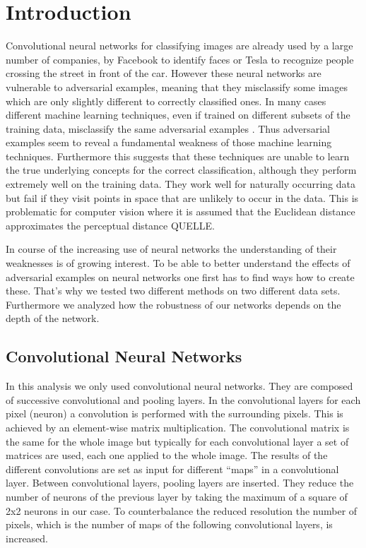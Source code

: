 \documentclass[%
 reprint,
 amsmath,amssymb,
 aps,
]{revtex4-1}
\begin{document}

\section{Introduction}

Convolutional neural networks for classifying images are already used by a large number of companies, by Facebook to identify faces or Tesla to recognize people crossing the street in front of the car. 
However these neural networks are vulnerable to adversarial examples, meaning that they misclassify some images which are only slightly different to correctly classified ones. In many cases different machine learning techniques, even if trained on different subsets of the training data, misclassify the same adversarial examples \cite{paperGrad}. Thus adversarial examples seem to reveal a fundamental weakness of those machine learning techniques. Furthermore this suggests that these techniques are unable to learn the true underlying concepts for the correct classification, although they perform extremely well on the training data. They work well for naturally occurring data but fail if they visit points in space that are unlikely to occur in the data. This is problematic for computer vision where it is assumed that the Euclidean distance approximates the perceptual distance QUELLE.

In course of the increasing use of neural networks the understanding of their weaknesses is of growing interest. To be able to better understand the effects of adversarial examples on neural networks one first has to find ways how to create these. That's why we tested two different methods on two different data sets. Furthermore we analyzed how the robustness of our networks depends on the depth of the network.

\subsection{Convolutional Neural Networks}


In this analysis we only used convolutional neural networks. They are composed of successive convolutional and pooling layers. In the convolutional layers for each pixel (neuron) a convolution is performed with the surrounding pixels. This is achieved by an element-wise matrix multiplication. The convolutional matrix is the same for the whole image but typically for each convolutional layer a set of matrices are used, each one applied to the whole image. The results of the different convolutions are set as input for different ``maps'' in a convolutional layer. Between convolutional layers, pooling layers are inserted. They reduce the number of neurons of the previous layer by taking the maximum of a square of 2x2 neurons in our case. To counterbalance the reduced resolution the number of pixels, which is the number of maps of the following convolutional layers, is increased.
\end{document}
